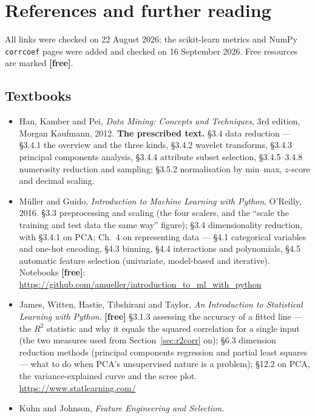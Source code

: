 \documentclass[11pt]{article}
\begin{document}
\section{References and further reading}

All links were checked on 22 August 2026; the scikit-learn metrics and NumPy
\texttt{corrcoef} pages were added and checked on 16 September 2026. Free resources are marked
\textbf{[free]}.

\subsection*{Textbooks}

\begin{itemize}[leftmargin=*]
  \item Han, Kamber and Pei, \emph{Data Mining: Concepts and Techniques}, 3rd
    edition, Morgan Kaufmann, 2012. \textbf{The prescribed text.} \S3.4 data
    reduction --- \S3.4.1 the overview and the three kinds,
    \S3.4.2 wavelet transforms, \S3.4.3 principal components analysis,
    \S3.4.4 attribute subset selection, \S3.4.5--3.4.8 numerosity reduction
    and sampling; \S3.5.2 normalisation by min--max, $z$-score and decimal
    scaling.
  \item M\"uller and Guido, \emph{Introduction to Machine Learning with
    Python}, O'Reilly, 2016. \S3.3 preprocessing and scaling (the four
    scalers, and the ``scale the training and test data the same way''
    figure); \S3.4 dimensionality reduction, with \S3.4.1 on PCA; Ch.~4 on
    representing data --- \S4.1 categorical variables and one-hot encoding,
    \S4.3 binning, \S4.4 interactions and polynomials, \S4.5 automatic feature
    selection (univariate, model-based and iterative). Notebooks
    \textbf{[free]}:
    \url{https://github.com/amueller/introduction_to_ml_with_python}
  \item James, Witten, Hastie, Tibshirani and Taylor, \emph{An Introduction to
    Statistical Learning with Python}. \textbf{[free]}
    \S3.1.3 assessing the accuracy of a fitted line --- the $R^2$ statistic
    and why it equals the squared correlation for a single input (the two
    measures used from Section~\ref{sec:r2corr} on); \S6.3 dimension
    reduction methods (principal components regression and partial least
    squares --- what to do when PCA's unsupervised nature is a problem);
    \S12.2 on PCA, the variance-explained curve and the scree plot.
    \url{https://www.statlearning.com/}
  \item Kuhn and Johnson, \emph{Feature Engineering and Selection}.

\end{itemize}
\end{document}
